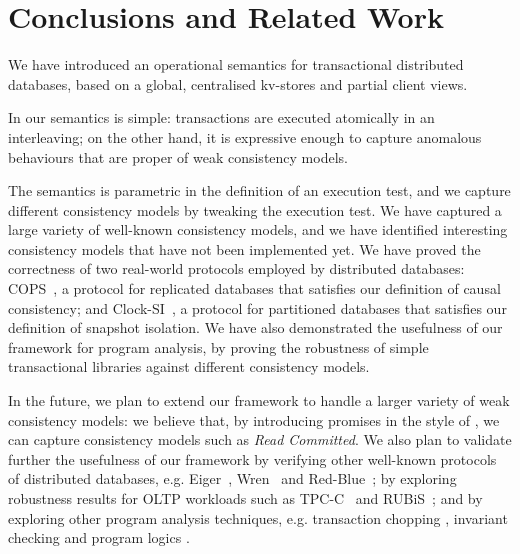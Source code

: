 \section{Conclusions and Related Work}
\label{sec:conclusions}
We have introduced  an  operational semantics for 
transactional distributed databases, based on a global, centralised 
kv-stores and partial client views. 


In our semantics is simple: transactions are executed atomically in an interleaving; on the other hand, it 
is  expressive enough to capture anomalous behaviours that are proper
of weak consistency models. 



The semantics is parametric in the definition of an execution test, and we capture different consistency 
models by tweaking the execution test. We have captured a large variety of well-known consistency 
models, 
and we have identified interesting consistency models that have not been 
implemented yet.
We have proved the correctness of two real-world protocols employed by distributed 
databases: COPS~\cite{cops}, a 
protocol for replicated databases that satisfies our definition of causal consistency;
and Clock-SI~\cite{clocksi}, a protocol for partitioned databases that satisfies our
definition of snapshot isolation. We have also demonstrated the usefulness of our framework
for program analysis, by proving the robustness of simple transactional 
libraries against different consistency models. 

In the future, we plan to extend our framework to handle a larger variety 
of weak consistency models: we believe that, by introducing promises 
in the style of \cite{promises}, we can capture  consistency models such 
as \emph{Read Committed}. We also plan to validate further the usefulness of our framework
by verifying other well-known protocols of 
distributed databases, e.g. Eiger~\cite{eiger}, Wren~\cite{wren} and
Red-Blue~\cite{redblue}; by exploring robustness results for OLTP
workloads  such as TPC-C~\cite{tpcc} and RUBiS~\cite{rubis}; 
and by exploring other program analysis techniques, e.g. 
transaction chopping \cite{chopping,psi-chopping}, invariant checking 
\cite{cise,repliss} and program logics \cite{alonetogether}. 

